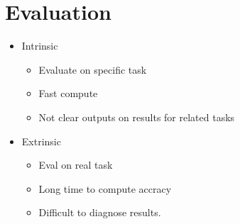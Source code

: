 \documentclass[a4paper]{article}
\begin{document}
\section{Evaluation}
\begin{itemize}
    \item Intrinsic
        \begin{itemize}
            \item Evaluate on specific task
            \item Fast compute
            \item Not clear outputs on results for related tasks
        \end{itemize}
    \item Extrinsic
        \begin{itemize}
            \item Eval on real task
            \item Long time to compute accracy
            \item Difficult to diagnose results.
        \end{itemize}
\end{itemize}
\end{document}

